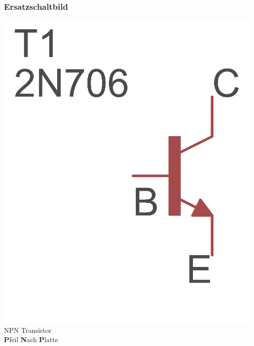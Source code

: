 \begin{frame}
\frametitle{Ersatzschaltbild}

\begin{minipage}{0.4\textwidth}
	\includegraphics[scale=1.4]{e13/NPN.png}\\
	NPN Transistor\\ \textbf{P}feil \textbf{N}ach \textbf{P}latte
\end{minipage}
\hspace{0.5cm}
\begin{minipage}{0.4\textwidth}

\end{minipage}
\end{frame}
